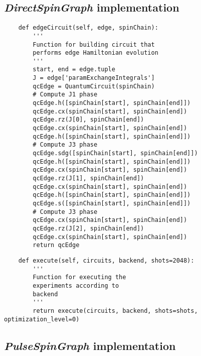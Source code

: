 \subsection{\textit{DirectSpinGraph} implementation}

    \begin{verbatim}
    def edgeCircuit(self, edge, spinChain):
        '''
        Function for building circuit that
        performs edge Hamiltonian evolution
        '''
        start, end = edge.tuple
        J = edge['paramExchangeIntegrals']
        qcEdge = QuantumCircuit(spinChain)
        # Compute J1 phase
        qcEdge.h([spinChain[start], spinChain[end]])
        qcEdge.cx(spinChain[start], spinChain[end])
        qcEdge.rz(J[0], spinChain[end])
        qcEdge.cx(spinChain[start], spinChain[end])
        qcEdge.h([spinChain[start], spinChain[end]])
        # Compute J3 phase
        qcEdge.sdg([spinChain[start], spinChain[end]])
        qcEdge.h([spinChain[start], spinChain[end]])
        qcEdge.cx(spinChain[start], spinChain[end])
        qcEdge.rz(J[1], spinChain[end])
        qcEdge.cx(spinChain[start], spinChain[end])
        qcEdge.h([spinChain[start], spinChain[end]])
        qcEdge.s([spinChain[start], spinChain[end]])
        # Compute J3 phase
        qcEdge.cx(spinChain[start], spinChain[end])
        qcEdge.rz(J[2], spinChain[end])
        qcEdge.cx(spinChain[start], spinChain[end])
        return qcEdge
    \end{verbatim}

    \begin{verbatim}
    def execute(self, circuits, backend, shots=2048):
        '''
        Function for executing the
        experiments according to
        backend
        '''
        return execute(circuits, backend, shots=shots, optimization_level=0)
    \end{verbatim}

\subsection{\textit{PulseSpinGraph} implementation}

